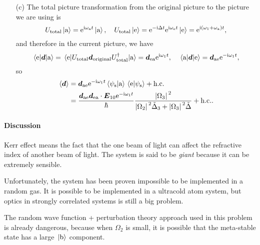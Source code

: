 \documentclass[hyperref, a4paper]{article}
\newcommand*{\ii}{\mathrm{i}}
\newcommand*{\ee}{\mathrm{e}}
\begin{document}
\begin{itemize}
\item[(c)] The total picture transformation from the original picture to the picture we are using is 
\begin{equation}
    U_\text{total} \ket*{\text{a}} = \ee^{\ii \omega_\text{a} t} \ket*{\text{a}}, \quad 
    U_\text{total} \ket*{\text{e}} = \ee^{- \ii \Delta t} \ee^{\ii \omega_\text{e} t} \ket*{\text{e}} = \ee^{\ii (\omega_1 + \omega_\text{a}) t} ,
\end{equation} 
and therefore in the current picture, we have 
\[
    \mel{\text{e}}{\vb*{d}}{\text{a}} = \mel{\text{e}}{U_\text{total} \vb*{d}_\text{original} U_\text{total}^\dagger }{\text{a}} = \vb*{d}_\text{ea} \ee^{\ii \omega_1 t}, \quad \mel{\text{a}}{\vb*{d}}{\text{e}} = \vb*{d}_\text{ae}  \ee^{- \ii \omega_1 t},
\]
so
\begin{equation}
    \begin{aligned}
        \expval*{\vb*{d}} &= \vb*{d}_\text{ae} \ee^{- \ii \omega_1 t} \braket*{\psi_\text{s}}{\text{a}} \braket*{\text{e}}{\psi_\text{s}} + \text{h.c.} \\
        &= \frac{\vb*{d}_\text{ae} \vb*{d}_\text{ea} \cdot \vb*{E}_{10} \ee^{- \ii \omega_1 t} }{\hbar} 
        \frac{\abs*{\Omega_3}^2}{\abs*{\Omega_2}^2 \tilde{\Delta}_3 + \abs*{\Omega_3}^2 \tilde{\Delta}} + \text{h.c.}.
    \end{aligned}
\end{equation}

\end{itemize}

\paragraph{Discussion} Kerr effect means the fact that the one beam of light can affect the refractive index 
of another beam of light. The system is said to be \emph{giant} because it can be extremely sensible.

Unfortunately, the system  has been proven impossible to be implemented in a random gas.
It is possible to be implemented in a ultracold atom system, but optics in strongly correlated systems is still
a big problem. 

The random wave function + perturbation theory approach used in this problem is already dangerous, because when 
$\Omega_2$ is small, it is possible that the meta-stable state has a large $\ket*{\text{b}}$ component.

\paragraph{}
\end{document}
